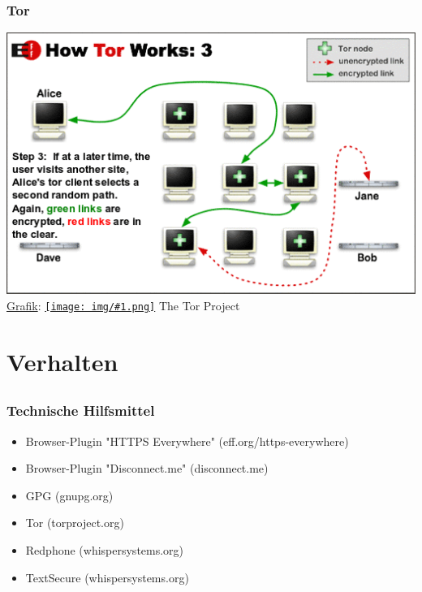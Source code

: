 \documentclass[12pt]{beamer}
\newcommand{\cc}[1]{\texttt{[image: img/\#1.png]}}
\begin{document}
\begin{frame}
    \frametitle{Tor}
    \includegraphics[height=0.7\textheight]{img/tor3.png}
    \\{\small \href{https://www.torproject.org/images/htw3.png}{Grafik}: \href{https://creativecommons.org/licenses/by/3.0/us/}{\cc{by}} The Tor Project}
\end{frame}

\section{Verhalten}
\subsection{}

\begin{frame}
    \frametitle{Technische Hilfsmittel}
    \begin{itemize}
        \item Browser-Plugin "HTTPS Everywhere" (eff.org/https-everywhere)
        \item Browser-Plugin "Disconnect.me" (disconnect.me)
        \item GPG (gnupg.org)
        \item Tor (torproject.org)
        \item Redphone (whispersystems.org)
        \item TextSecure (whispersystems.org)
    \end{itemize}
\end{frame}
\end{document}
